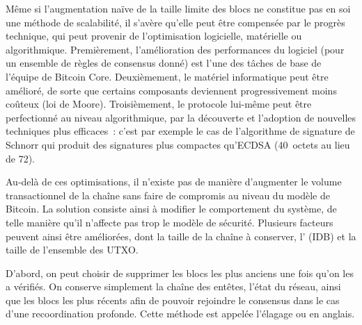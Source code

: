 Même si l'augmentation naïve de la taille limite des blocs ne constitue pas en soi une méthode de scalabilité, il s'avère qu'elle peut être compensée par le progrès technique, qui peut provenir de l'optimisation logicielle, matérielle ou algorithmique. Premièrement, l'amélioration des performances du logiciel (pour un ensemble de règles de consensus donné) est l'une des tâches de base de l'équipe de Bitcoin Core. Deuxièmement, le matériel informatique peut être amélioré, de sorte que certains composants deviennent progressivement moins coûteux (loi de Moore). Troisièmement, le protocole lui-même peut être perfectionné au niveau algorithmique, par la découverte et l'adoption de nouvelles techniques plus efficaces~: c'est par exemple le cas de l'algorithme de signature de Schnorr qui produit des signatures plus compactes qu'ECDSA (40~octets au lieu de 72).

Au-delà de ces optimisations, il n'existe pas de manière d'augmenter le volume transactionnel de la chaîne sans faire de compromis au niveau du modèle de Bitcoin. La solution consiste ainsi à modifier le comportement du système, de telle manière qu'il n'affecte pas trop le modèle de sécurité. Plusieurs facteurs peuvent ainsi être améliorées, dont la taille de la chaîne à conserver, l' (IDB) et la taille de l'ensemble des UTXO.

D'abord, on peut choisir de supprimer les blocs les plus anciens une fois qu'on les a vérifiés. On conserve simplement la chaîne des entêtes, l'état du réseau, ainsi que les blocs les plus récents afin de pouvoir rejoindre le consensus dans le cas d'une recoordination profonde. Cette méthode est appelée l'élagage ou  en anglais.

